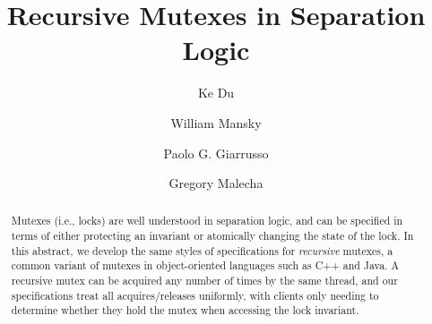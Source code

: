 \documentclass[sigplan,screen]{acmart}
\begin{document}
\title{Recursive Mutexes in Separation Logic}

\author{Ke Du}

\author{William Mansky}

\author{Paolo G. Giarrusso}

\author{Gregory Malecha}

\renewcommand{\shortauthors}{Du et al.}

\newcommand{\mutexR}{\ensuremath{\mathsf{rmutex}}}

\begin{abstract}
Mutexes (i.e., locks) are well understood in separation logic, and can be specified in terms of either protecting an invariant or atomically changing the state of the lock. In this abstract, we develop the same styles of specifications for \emph{recursive} mutexes, a common variant of mutexes in object-oriented languages such as C++ and Java. A recursive mutex can be acquired any number of times by the same thread, and our specifications treat all acquires/releases uniformly, with clients only needing to determine whether they hold the mutex when accessing the lock invariant.
\end{abstract}
\end{document}

